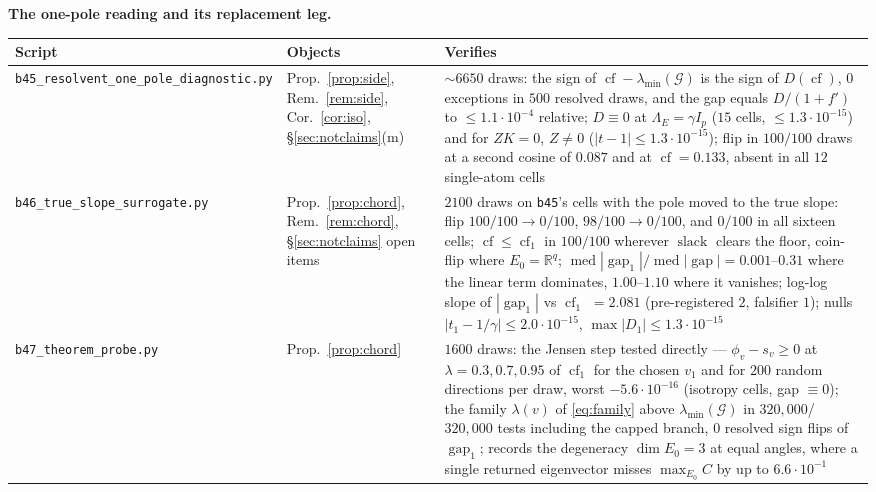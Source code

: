 \documentclass[11pt]{article}
\theoremstyle{remark}
\newcommand{\Gr}{\mathcal{G}}
\newcommand{\Le}{\Lambda_E}
\begin{document}
\noindent\textbf{The one-pole reading and its replacement leg.}
\begin{center}\footnotesize\begin{tabular}{@{}>{\raggedright\arraybackslash}p{5.1cm}%
>{\raggedright\arraybackslash}p{2.5cm}>{\raggedright\arraybackslash}p{5.8cm}@{}}
\toprule Script & Objects & Verifies\\
\midrule
\texttt{b45\_resolvent\_one\_pole\_\allowbreak diagnostic.py} & Prop.~\ref{prop:side}, Rem.~\ref{rem:side},
Cor.~\ref{cor:iso}, \S\ref{sec:notclaims}(m) & ${\sim}6650$ draws: the sign of
$\operatorname{cf}-\lambda_{\min}(\Gr)$ is the sign of $D(\operatorname{cf})$, $0$ exceptions in $500$
resolved draws, and the gap equals $D/(1+f')$ to $\le1.1\cdot10^{-4}$ relative; $D\equiv0$ at
$\Le=\gamma I_p$ ($15$ cells, $\le1.3\cdot10^{-15}$) and for $ZK=0$, $Z\ne0$
($|t-1|\le1.3\cdot10^{-15}$); flip in $100/100$ draws at a second cosine of $0.087$ and at
$\operatorname{cf}=0.133$, absent in all $12$ single-atom cells\\
\texttt{b46\_true\_slope\_surrogate.py} & Prop.~\ref{prop:chord}, Rem.~\ref{rem:chord},
\S\ref{sec:notclaims} open items & $2100$ draws on \texttt{b45}'s cells with the pole moved to the
true slope: flip $100/100\to0/100$, $98/100\to0/100$, and $0/100$ in all sixteen cells;
$\operatorname{cf}\le\operatorname{cf}_1$ in $100/100$ wherever $\operatorname{slack}$ clears the
floor, coin-flip where $E_0=\mathbb R^q$; $\operatorname{med}|\operatorname{gap}_1|/
\operatorname{med}|\operatorname{gap}|=0.001$--$0.31$ where the linear term dominates, $1.00$--$1.10$
where it vanishes; log-log slope of $|\operatorname{gap}_1|$ vs $\operatorname{cf}_1$ $=2.081$
(pre-registered $2$, falsifier $1$); nulls $|t_1-1/\gamma|\le2.0\cdot10^{-15}$,
$\max|D_1|\le1.3\cdot10^{-15}$\\
\texttt{b47\_theorem\_probe.py} & Prop.~\ref{prop:chord} & $1600$ draws: the Jensen step tested
directly --- $\phi_v-\allowbreak s_v\ge0$ at $\lambda=0.3,0.7,0.95$ of $\operatorname{cf}_1$ for the
chosen $v_1$ and for $200$ random directions per draw, worst $-5.6\cdot10^{-16}$ (isotropy cells, gap
$\equiv0$); the family $\lambda(v)$ of \eqref{eq:family} above $\lambda_{\min}(\Gr)$ in
$320{,}000$/$320{,}000$ tests including the capped branch, $0$ resolved sign flips of
$\operatorname{gap}_1$; records the degeneracy $\dim E_0=3$ at equal angles, where a single returned
eigenvector misses $\max_{E_0}C$ by up to $6.6\cdot10^{-1}$\\
\end{tabular}\end{center}
\end{document}
